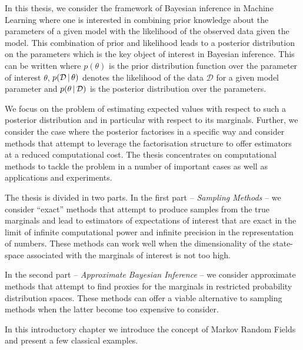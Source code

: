 
In this thesis, we consider the framework of Bayesian inference in Machine Learning where one is interested in combining prior knowledge about the parameters of a given model with the likelihood of the observed data given the model. 
This combination of prior and likelihood leads to a posterior distribution on the parameters which is the key object of interest in Bayesian inference. This can be written
where $p(\theta)$ is the prior distribution function over the parameter of interest $\theta$, $p(\mathcal D\,|\, \theta)$ denotes the likelihood of the data $\mathcal D$ for a given model parameter and $p(\theta\,|\, \mathcal D)$ is the posterior distribution over the parameters. 

We focus on the problem of estimating expected values with respect to such a posterior distribution and in particular with respect to its marginals. 
Further, we consider the case where the posterior factorises in a specific way and consider methods that attempt to leverage the factorisation structure to offer estimators at a reduced computational cost. 
The thesis concentrates on computational methods to tackle the problem in a number of important cases as well as applications and experiments. 

The thesis is divided in two parts. In the first part -- \emph{Sampling Methods} -- we consider ``exact'' methods that attempt to produce samples from the true marginals and lead to estimators of expectations of interest that are exact in the limit of infinite computational power and infinite precision in the representation of numbers. These methods can work well when the dimensionality of the state-space associated with the marginals of interest is not too high. 

In the second part -- \emph{Approximate Bayesian Inference} -- we consider approximate methods that attempt to find proxies for the marginals in restricted probability distribution spaces. These methods can offer a viable alternative to sampling methods when the latter become too expensive to consider. 

In this introductory chapter we introduce the concept of Markov Random Fields and present a few classical examples.

